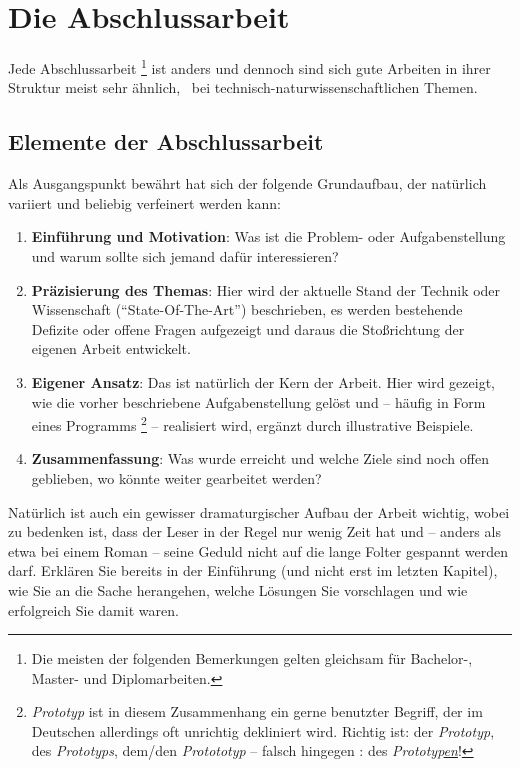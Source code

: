 \chapter{Die Abschlussarbeit}
\label{cha:Diplomschrift}

Jede Abschlussarbeit%
\footnote{Die meisten der folgenden Bemerkungen gelten gleichsam für Bachelor-, Master- und Diplomarbeiten.} 
ist anders und dennoch sind sich gute
Arbeiten in ihrer Struktur meist sehr ähnlich, \va\ bei
technisch-natur\-wissen\-schaft\-lichen Themen. 

\section{Elemente der Abschlussarbeit}

Als Ausgangspunkt bewährt hat sich der folgende Grundaufbau, der natürlich 
vari\-iert und beliebig verfeinert werden kann:
%
\begin{enumerate}
\item \textbf{Einführung und Motivation}: Was ist die Problem- oder Aufgabenstellung und
warum sollte sich jemand dafür interessieren?
\item \textbf{Präzisierung des Themas}: Hier wird der aktuelle Stand der Technik
oder Wissenschaft ("`State-Of-The-Art"') beschrieben, es werden bestehende
Defizite oder offene Fragen aufgezeigt und daraus die
Stoßrichtung der eigenen Arbeit entwickelt.
\item \textbf{Eigener Ansatz}: Das ist natürlich der Kern der Arbeit. Hier
wird gezeigt, wie die vorher beschriebene Aufgabenstellung gelöst und --
häufig in Form eines Programms%
\footnote{\emph{Prototyp} ist in diesem Zusammenhang ein gerne benutzter Begriff, der im Deutschen
allerdings oft unrichtig dekliniert wird. Richtig ist: der \emph{Prototyp}, des \emph{Prototyps}, dem/den \emph{Protototyp} -- falsch hingegen \zB: des \emph{Prototyp\underline{en}}!
} --
realisiert wird, ergänzt durch illustrative Beispiele.
\item \textbf{Zusammenfassung}: Was wurde erreicht und welche Ziele sind
noch offen geblieben, wo könnte weiter gearbeitet werden?
\end{enumerate}
%
Natürlich ist auch ein gewisser dramaturgischer Aufbau der Arbeit
wichtig, wobei zu bedenken ist, dass der Leser in der Regel nur
wenig Zeit hat und -- anders als etwa bei einem Roman -- seine
Geduld nicht auf die lange Folter gespannt werden darf. Erklären
Sie bereits in der Einführung (und nicht erst im letzten Kapitel),
wie Sie an die Sache herangehen, welche Lösungen Sie vorschlagen
und wie erfolgreich Sie damit waren.

